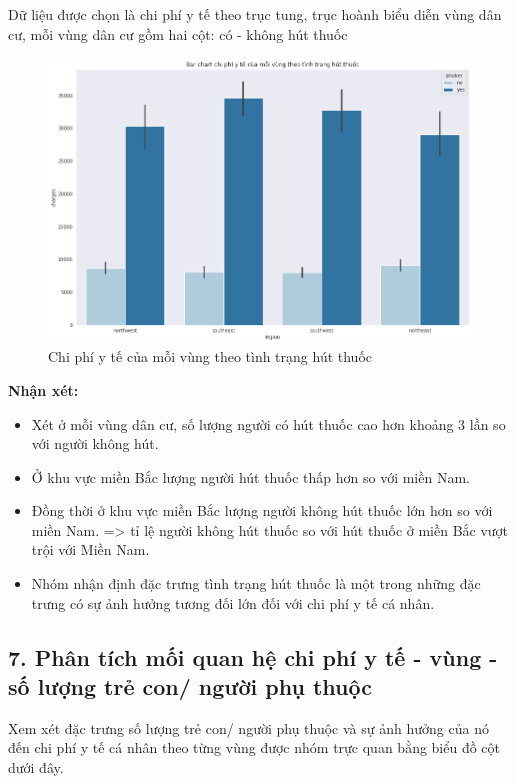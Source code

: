 \documentclass{article}
\begin{document}
	Dữ liệu được chọn là chi phí y tế theo trục tung, trục hoành biểu diễn vùng dân cư, mỗi vùng dân cư gồm hai cột: có - không hút thuốc
	\begin{figure}[H]
		\centering
		\includegraphics[width=1\textwidth]{images/bar_chart_medical_charges_region_smoker.png}
		\caption{Chi phí y tế của mỗi vùng theo tình trạng hút thuốc}
		\label{fig:writing-thesis-bar-chart-medical-charges-region-smoker}
	\end{figure}
	\textbf{Nhận xét:} 
	\begin{itemize}
		\item Xét ở mỗi vùng dân cư, số lượng người có hút thuốc cao hơn khoảng 3 lần so với người không hút.
		\item Ở khu vực miền Bắc lượng người hút thuốc thấp hơn so với miền Nam.
		\item Đồng thời ở khu vực miền Bắc lượng người không hút thuốc lớn hơn so với miền Nam. => tỉ lệ người không hút thuốc so với hút thuốc ở miền Bắc vượt trội với Miền Nam.
		\item Nhóm nhận định đặc trưng tình trạng hút thuốc là một trong những đặc trưng có sự ảnh hưởng tương đối lớn đối với chi phí y tế cá nhân.
	\end{itemize}

	\subsection{7. Phân tích mối quan hệ chi phí y tế - vùng - số lượng trẻ con/ người phụ thuộc}
	\qquad Xem xét đặc trưng số lượng trẻ con/ người phụ thuộc và sự ảnh hưởng của nó đến chi phí y tế cá nhân theo từng vùng được nhóm trực quan bằng biểu đồ cột dưới đây.
	
\end{document}

